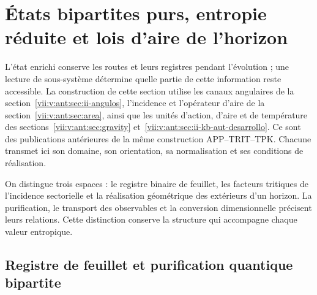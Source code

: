 
\section{États bipartites purs, entropie réduite et lois d’aire de l’horizon}
\label{vii:vii:sec:horizontes-informacion}

L'état enrichi conserve les routes et leurs registres pendant
l'évolution ; une lecture de sous-système détermine quelle partie de cette information
reste accessible. La construction de cette section utilise les canaux
angulaires de la section~\ref{vii:v:ant:sec:ii-angulos}, l'incidence et
l'opérateur d'aire de la section~\ref{vii:v:ant:sec:area}, ainsi que les unités
d'action, d'aire et de température des
sections~\ref{vii:v:ant:sec:gravity}
et~\ref{vii:v:ant:sec:ii-kb-aut-desarrollo}. Ce sont des publications antérieures de la
même construction APP--TRIT--TPK. Chacune transmet ici son domaine,
son orientation, sa normalisation et ses conditions de réalisation.

On distingue trois espaces : le registre binaire de feuillet, les facteurs
tritiques de l'incidence sectorielle et la réalisation géométrique des
extérieurs d'un horizon. La purification, le transport des observables
et la conversion dimensionnelle précisent leurs relations. Cette
distinction conserve la structure qui accompagne chaque valeur entropique.

\subsection{Registre de feuillet et purification quantique bipartite}
\label{vii:vii:subsec:hojas-purificacion}

